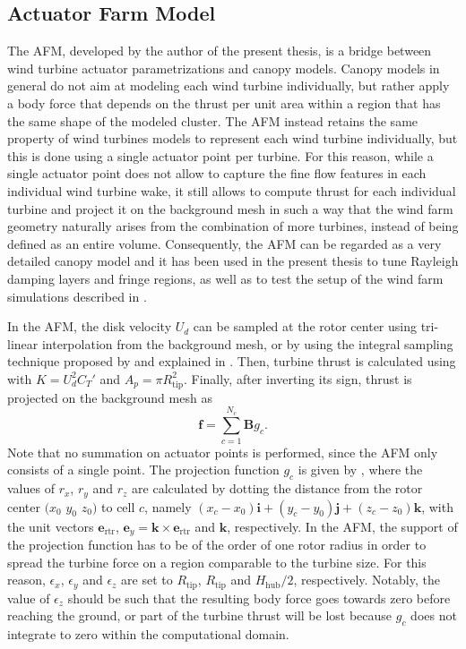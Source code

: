 \subsection{Actuator Farm Model}
\label{subsec:actuatorFarmModel}
The AFM, developed by the author of the present thesis, is a bridge between wind turbine actuator parametrizations and canopy models. Canopy models in general do not aim at modeling each wind turbine individually, but rather apply a body force that depends on the thrust per unit area within a region that has the same shape of the modeled cluster. The AFM instead retains the same property of wind turbines models to represent each wind turbine individually, but this is done using a single actuator point per turbine. For this reason, while a single actuator point does not allow to capture the fine flow features in each individual wind turbine wake, it still allows to compute thrust for each individual turbine and project it on the background mesh in such a way that the wind farm geometry naturally arises from the combination of more turbines, instead of being defined as an entire volume. Consequently, the AFM can be regarded as a very detailed canopy model and it has been used in the present thesis to tune Rayleigh damping layers and fringe regions, as well as to test the setup of the wind farm simulations described in .

In the AFM, the disk velocity $U_d$ can be sampled at the rotor center using tri-linear interpolation from the background mesh, or by using the integral sampling technique proposed by \cite{ChurchfieldEtAl2017} and explained in . Then, turbine thrust is calculated using  with $K=U_d^2C_T'$ and $A_p=\pi R_\text{tip}^2$. Finally, after inverting its sign, thrust is projected on the background mesh as 
\begin{equation}
	\mathbf{f} = \sum_{c=1}^{N_c} \mathbf{B} g_{c}. \label{eq:forceProjectionAFM}
\end{equation}
Note that no summation on actuator points is performed, since the AFM only consists of a single point. The projection function $g_{c}$ is given by , where the values of $r_x$, $r_y$ and $r_z$ are calculated by dotting the distance from the rotor center $(x_0$ $y_0$ $z_0)$ to cell $c$, namely $(x_c - x_0)\mathbf{i} + (y_c - y_0)\mathbf{j} + (z_c - z_0)\mathbf{k}$, with the unit vectors $\mathbf{e}_\text{rtr}$, $\mathbf{e}_{y}=\mathbf{k}\times\mathbf{e}_\text{rtr}$ and $\mathbf{k}$, respectively. In the AFM, the support of the projection function has to be of the order of one rotor radius in order to spread the turbine force on a region comparable to the turbine size. For this reason, $\epsilon_x$, $\epsilon_y$ and $\epsilon_z$ are set to $R_\text{tip}$, $R_\text{tip}$ and $H_\text{hub}/2$, respectively. Notably, the value of $\epsilon_z$ should be such that the resulting body force goes towards zero before reaching the ground, or part of the turbine thrust will be lost because $g_{c}$ does not integrate to zero within the computational domain. 

